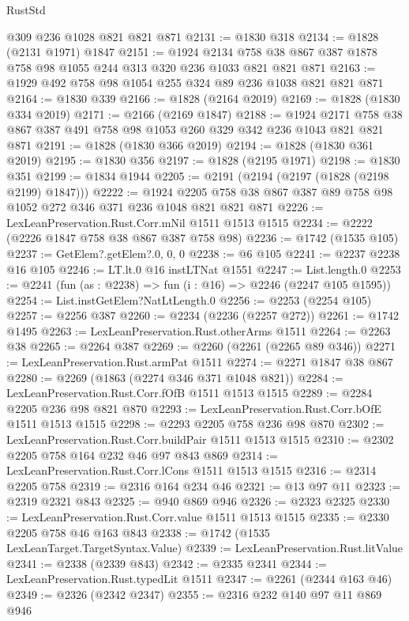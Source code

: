 \begin{lexlean}{RustStd}
\begin{coremodule}
    @309
    @236
    @1028
    @821
    @821
    @871
@2131 := @1830 @318
@2134 := @1828 (@2131 @1971) @1847
@2151 := @1924
    @2134
    @758
    @38
    @867
    @387
    @1878
    @758
    @98
    @1055
    @244
    @313
    @320
    @236
    @1033
    @821
    @821
    @871
@2163 := @1929 @492 @758 @98 @1054 @255 @324 @89 @236 @1038 @821 @821 @871
@2164 := @1830 @339
@2166 := @1828 (@2164 @2019)
@2169 := @1828 (@1830 @334 @2019)
@2171 := @2166 (@2169 @1847)
@2188 := @1924 @2171 @758 @38 @867 @387 @491 @758 @98 @1053 @260 @329 @342 @236 @1043 @821 @821 @871
@2191 := @1828 (@1830 @366 @2019)
@2194 := @1828 (@1830 @361 @2019)
@2195 := @1830 @356
@2197 := @1828 (@2195 @1971)
@2198 := @1830 @351
@2199 := @1834 @1944
@2205 := @2191 (@2194 (@2197 (@1828 (@2198 @2199) @1847)))
@2222 := @1924 @2205 @758 @38 @867 @387 @89 @758 @98 @1052 @272 @346 @371 @236 @1048 @821 @821 @871
@2226 := LexLeanPreservation.Rust.Corr.mNil @1511 @1513 @1515
@2234 := @2222 (@2226 @1847 @758 @38 @867 @387 @758 @98)
@2236 := @1742 (@1535 @105)
@2237 := GetElem?.getElem?.{0, 0, 0}
@2238 := @6 @105
@2241 := @2237 @2238 @16 @105
@2246 := LT.lt.{0} @16 instLTNat @1551
@2247 := List.length.{0}
@2253 := @2241 (fun (as : @2238) => fun (i : @16) => @2246 (@2247 @105 @1595))
@2254 := List.instGetElem?NatLtLength.{0}
@2256 := @2253 (@2254 @105)
@2257 := @2256 @387
@2260 := @2234 (@2236 (@2257 @272))
@2261 := @1742 @1495
@2263 := LexLeanPreservation.Rust.otherArms @1511
@2264 := @2263 @38
@2265 := @2264 @387
@2269 := @2260 (@2261 (@2265 @89 @346))
@2271 := LexLeanPreservation.Rust.armPat @1511
@2274 := @2271 @1847 @38 @867
@2280 := @2269 (@1863 (@2274 @346 @371 @1048 @821))
@2284 := LexLeanPreservation.Rust.Corr.fOfB @1511 @1513 @1515
@2289 := @2284 @2205 @236 @98 @821 @870
@2293 := LexLeanPreservation.Rust.Corr.bOfE @1511 @1513 @1515
@2298 := @2293 @2205 @758 @236 @98 @870
@2302 := LexLeanPreservation.Rust.Corr.buildPair @1511 @1513 @1515
@2310 := @2302 @2205 @758 @164 @232 @46 @97 @843 @869
@2314 := LexLeanPreservation.Rust.Corr.lCons @1511 @1513 @1515
@2316 := @2314 @2205 @758
@2319 := @2316 @164 @234 @46
@2321 := @13 @97 @11
@2323 := @2319 @2321 @843
@2325 := @940 @869 @946
@2326 := @2323 @2325
@2330 := LexLeanPreservation.Rust.Corr.value @1511 @1513 @1515
@2335 := @2330 @2205 @758 @46 @163 @843
@2338 := @1742 (@1535 LexLeanTarget.TargetSyntax.Value)
@2339 := LexLeanPreservation.Rust.litValue
@2341 := @2338 (@2339 @843)
@2342 := @2335 @2341
@2344 := LexLeanPreservation.Rust.typedLit @1511
@2347 := @2261 (@2344 @163 @46)
@2349 := @2326 (@2342 @2347)
@2355 := @2316 @232 @140 @97 @11 @869 @946

\end{coremodule}
\end{lexlean}
